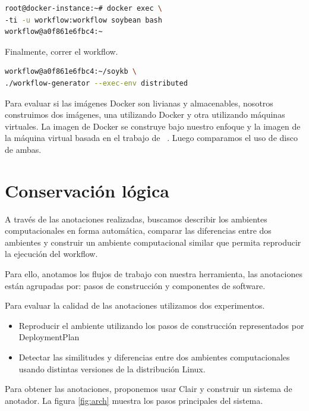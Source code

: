 \begin{lstlisting}[caption={Entrar al ambiente computacional utilizando bash},label={lst:2},language=bash]
root@docker-instance:~# docker exec \
-ti -u workflow:workflow soybean bash
workflow@a0f861e6fbc4:~ 
\end{lstlisting}

Finalmente, correr el workflow. 

\begin{lstlisting}[caption={Run the workflow},label={lst:3},language=bash]
workflow@a0f861e6fbc4:~/soykb \
./workflow-generator --exec-env distributed	
\end{lstlisting}

Para evaluar si las imágenes Docker son livianas y almacenables, nosotros construimos dos imágenes, una utilizando Docker y otra utilizando máquinas virtuales. La imagen de Docker se construye bajo nuestro enfoque y la imagen de la máquina virtual basada en el trabajo de ~\cite{santana2017reproducibility}. Luego comparamos el uso de disco de ambas.



\section{Conservación lógica}\label{s5.3}

A través de las anotaciones realizadas, buscamos describir los ambientes computacionales en forma automática, comparar las diferencias entre dos ambientes y construir un ambiente computacional similar que permita reproducir la ejecución del workflow. 

Para ello, anotamos los flujos de trabajo con nuestra herramienta, las anotaciones están agrupadas por: pasos de construcción y componentes de software. 

Para evaluar la calidad de las anotaciones utilizamos dos experimentos.

\begin{itemize}
	\item Reproducir el ambiente utilizando los pasos de construcción representados por DeploymentPlan
	\item Detectar las similitudes y diferencias entre dos ambientes computacionales usando distintas versiones de la distribución Linux.
\end{itemize}

Para obtener las anotaciones, proponemos usar Clair y construir un sistema de anotador. La figura \ref{fig:arch} muestra los pasos principales del sistema.


